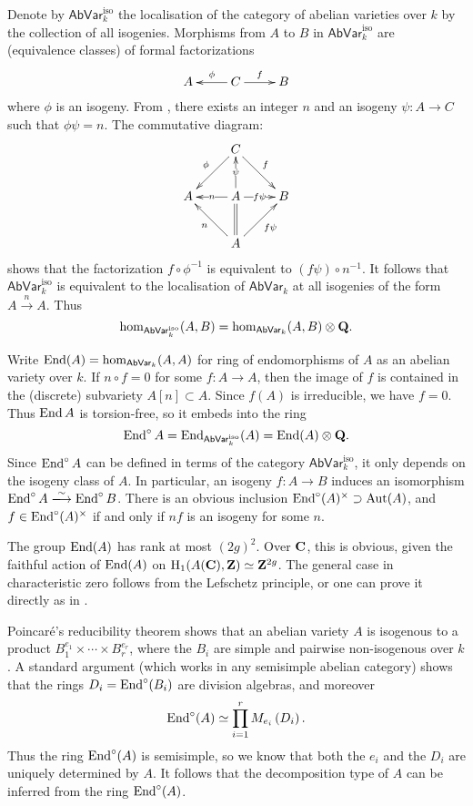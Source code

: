Denote by $\mathsf{AbVar}_k^\mathrm{iso}$ the localisation of the category of 
abelian varieties over $k$ by the collection of all isogenies. Morphisms from 
$A$ to $B$ in $\mathsf{AbVar}_k^\mathrm{iso}$ are (equivalence classes) of 
formal factorizations 
\[\xymatrix{
  A 
    & C \ar[l]_-\phi \ar[r]^-f 
    & B
}\]
where $\phi$ is an isogeny. From \cite[5.12]{gm13}, %
there exists an integer $n$ 
and an isogeny $\psi:A\to C$ such that $\phi\psi=n$. The commutative diagram:
\[\xymatrix{
  & C \ar[dl]_-\phi \ar[dr]^-f \\
  A & A \ar[l]|-n \ar[u]|-\psi \ar[r]|-{f\psi} \ar@{=}[d] & B \\
  & A \ar[ul]^-n \ar[ur]_-{f\psi}
}\]
shows that the factorization $f\circ \phi^{-1}$ is equivalent to 
$(f\psi)\circ n^{-1}$. It follows that $\mathsf{AbVar}_k^\mathrm{iso}$ is 
equivalent to the localisation of $\mathsf{AbVar}_k$ at all isogenies of the 
form $A\xrightarrow n A$. Thus 
\[
  \hom_{\mathsf{AbVar}_k^\mathrm{iso}}(A,B) = \hom_{\mathsf{AbVar}_k}(A,B)\otimes\mathbf{Q} \text{.}
\]

Write $\operatorname{End}(A)=\hom_{\mathsf{AbVar}_k}(A,A)$ for ring of endomorphisms of $A$ 
as an abelian variety over $k$. If $n\circ f=0$ for some $f:A\to A$, then the 
image of $f$ is contained in the (discrete) subvariety $A[n]\subset A$. Since 
$f(A)$ is irreducible, we have $f=0$. Thus $\operatorname{End} A$ is torsion-free, so it 
embeds into the ring
\[
  \operatorname{End}^\circ A = \operatorname{End}_{\mathsf{AbVar}_k^\mathrm{iso}}(A) = \operatorname{End}(A)\otimes\mathbf{Q} \text{.}
\]
Since $\operatorname{End}^\circ A$ can be defined in terms of the category 
$\mathsf{AbVar}_{k}^\mathrm{iso}$, it only depends on the isogeny class of 
$A$. In particular, an isogeny $f:A\to B$ induces an isomorphism 
$\End^\circ A\isomorphism \End^\circ B$. 
There is an obvious inclusion $\operatorname{End}^\circ(A)^\times\supset\operatorname{Aut}(A)$, and  
$f\in \operatorname{End}^\circ(A)^\times$ if and only if $n f$ is an isogeny for some $n$.

The group $\operatorname{End}(A)$ has rank at most $(2 g)^2$. Over $\mathbf{C}$, this is obvious, 
given the faithful action of $\operatorname{End}(A)$ on $\operatorname{H}_1(A(\mathbf{C}),\mathbf{Z})\simeq \mathbf{Z}^{2g}$. 
The general case in characteristic zero follows from the Lefschetz principle, 
or one can prove it directly as in \cite[IV.18.3]{mu08}. 

Poincar\'e's reducibility theorem shows that an abelian variety $A$ is 
isogenous to a product $B_1^{e_1}\times \cdots \times B_r^{e_r}$, where the 
$B_i$ are simple and pairwise non-isogenous over $k$. A standard argument 
(which works in any semisimple abelian category) shows that the rings 
$D_i=\operatorname{End}^\circ(B_i)$ are division algebras, and moreover 
\[
  \operatorname{End}^\circ(A) \simeq \prod_{i=1}^r M_{e_i}\left(D_i\right) \text{.}
\]
Thus the ring $\operatorname{End}^\circ(A)$ is semisimple, so we know that both the $e_i$ and 
the $D_i$ are uniquely determined by $A$. It follows that the decomposition 
type of $A$ can be inferred from the ring $\operatorname{End}^\circ(A)$. 

